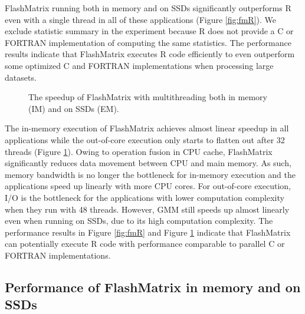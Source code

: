 FlashMatrix running both in memory and on SSDs significantly outperforms R
even with a single thread in all of these applications (Figure \ref{fig:fmR}).
We exclude statistic summary in the experiment because R does not provide
a C or FORTRAN implementation of computing the same statistics. The performance
results indicate that FlashMatrix executes R code efficiently to even outperform
some optimized C and FORTRAN implementations when processing large datasets.

\begin{figure}
	\begin{center}
		\footnotesize
		\vspace{-15pt}
		
		\vspace{-10pt}
		\caption{The speedup of FlashMatrix with multithreading both in memory (IM)
		and on SSDs (EM).}
		\label{fig:speedup}
	\end{center}
\end{figure}

The in-memory execution of FlashMatrix achieves almost linear speedup in all
applications while the out-of-core execution only
starts to flatten out after 32 threads (Figure \ref{fig:speedup}). Owing to
operation fusion in CPU cache, FlashMatrix significantly reduces data movement
between CPU and main memory. As such, memory bandwidth is no longer the bottleneck
for in-memory execution and the applications speed up linearly with more CPU cores.
For out-of-core execution, I/O is the bottleneck for the applications with
lower computation complexity when they run with 48 threads. However,
GMM still speeds up almost linearly even when running on SSDs, due to its high
computation complexity. The performance results in Figure \ref{fig:fmR} and Figure
\ref{fig:speedup} indicate that FlashMatrix can potentially execute R code with
performance comparable to parallel C or FORTRAN implementations.

%		

\subsection{Performance of FlashMatrix in memory and on SSDs}


